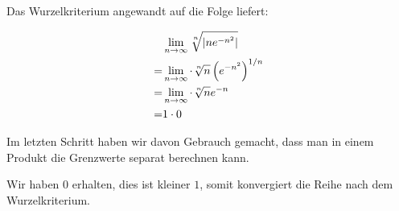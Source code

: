 \item Das Wurzelkriterium angewandt auf die Folge liefert:

\begin{alignat*}{1}
	  &\lim\limits_{n\to\infty} \nroot{n}{\left|n e^{-n^2}\right|} \\
	= & \lim\limits_{n\to\infty} \cdot \nroot{n}{n} \left(e^{-n^2}\right)^{1/n} \\
	= & \lim\limits_{n\to\infty} \cdot \nroot{n}{n} e^{-n} \\
	= & 1 \cdot 0
\end{alignat*}

Im letzten Schritt haben wir davon Gebrauch gemacht, dass man in einem Produkt die Grenzwerte separat berechnen kann.

Wir haben $0$ erhalten, dies ist kleiner $1$, somit konvergiert die Reihe nach dem Wurzelkriterium.
